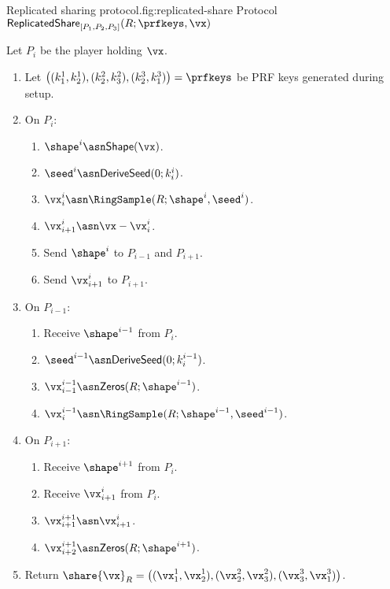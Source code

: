 
\begin{Boxfig}{Replicated sharing protocol.}{fig:replicated-share}
  {Protocol $\mathsf{ReplicatedShare}_{[P_1, P_2, P_3]}(R; \prfkeys, \vx)$}
  
  Let $P_i$ be the player holding $\vx$.
  
  \begin{enumerate}
  \item Let $\left( (k_1^1, k_2^1), (k_2^2, k_3^2), (k_2^3, k_1^3) \right) = \prfkeys$ be PRF keys generated during setup.
  
  \item On $P_i$:
  \begin{enumerate}
    \item $\shape^i \asn \mathsf{Shape}(\vx)$.
    \item ${\seed}^i \asn \mathsf{DeriveSeed}(0; k^i_i)$.
    \item $\vx_i^i \asn \RingSample(R; \shape^i, \seed^i)$.
    \item $\vx_{i+1}^i \asn \vx - \vx_i^i$.
    \item Send $\shape^i$ to $P_{i-1}$ and $P_{i+1}$.
    \item Send $\vx_{i+1}^i$ to $P_{i+1}$.
  \end{enumerate}
  
  \item On $P_{i-1}$:
  \begin{enumerate}
    \item Receive $\shape^{i-1}$ from $P_i$.
    \item ${\seed}^{i-1} \asn \mathsf{DeriveSeed}(0; k^{i-1}_i)$.
    \item $\vx_{i-1}^{i-1} \asn \mathsf{Zeros}(R; \shape^{i-1})$.
    \item $\vx_i^{i-1} \asn \RingSample(R; \shape^{i-1}, \seed^{i-1})$.
  \end{enumerate}
  
  \item On $P_{i+1}$:
  \begin{enumerate}
    \item Receive $\shape^{i+1}$ from $P_i$.
    \item Receive $\vx_{i+1}^i$ from $P_i$.
    \item $\vx_{i+1}^{i+1} \asn \vx_{i+1}^i$.
    \item $\vx_{i+2}^{i+1} \asn \mathsf{Zeros}(R; \shape^{i+1})$.
  \end{enumerate}
  
  \item Return $\share{\vx}_R = \left( (\vx_1^1, \vx_2^1), (\vx_2^2, \vx_3^2), (\vx_3^3, \vx_1^3) \right)$.
  \end{enumerate}
\end{Boxfig}

